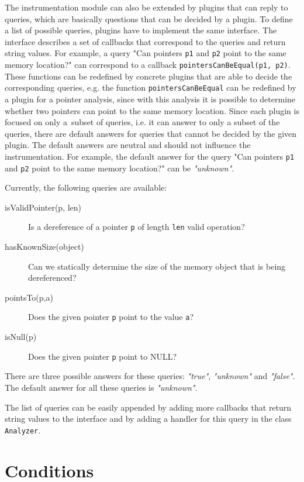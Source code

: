 The instrumentation module can also be extended by plugins that can reply to
queries, which are basically questions that can be decided by a plugin. To
define a list of possible queries, plugins have to implement the same
interface. The interface describes a set of callbacks that correspond to the
queries and return string values. For example, a query "Can pointers
\texttt{p1} and \texttt{p2} point to the same memory location?" can correspond
to a callback \texttt{pointersCanBeEqual(p1, p2)}. These functions can be
redefined by concrete plugins that are able to decide the corresponding
queries, e.g.  the function \texttt{pointersCanBeEqual} can be redefined by a
plugin for a pointer analysis, since with this analysis it is possible to
determine whether two pointers can point to the same memory location. Since
each plugin is focused on only a~subset of queries, i.e. it can answer to only
a subset of the queries, there are default answers for queries that cannot be
decided by the given plugin. The default answers are neutral and should not
influence the instrumentation. For example, the default answer for the query
"Can pointers \texttt{p1} and \texttt{p2} point to the same memory location?"
can be \emph{"unknown"}.

Currently, the following queries are available:
\begin{description}
  \item[isValidPointer(p, len)] Is a dereference of a pointer \texttt{p} of
        length \texttt{len} valid operation?
  \item[hasKnownSize(object)] Can we statically determine the size of the memory
         object that is being dereferenced?
  \item[pointsTo(p,a)] Does the given pointer \texttt{p} point to the value \texttt{a}?
  \item[isNull(p)] Does the given pointer \texttt{p} point to NULL?
\end{description}
There are three possible answers for these queries:
\emph{"true"}, \emph{"unknown"} and \emph{"false"}. The default answer for all
these queries is \emph{"unknown"}.

The list of queries can be easily appended by adding more callbacks that return
string values to the interface and by  adding a
handler for this query in the class \texttt{Analyzer}.

\section{Conditions}\label{sec:conditions}

